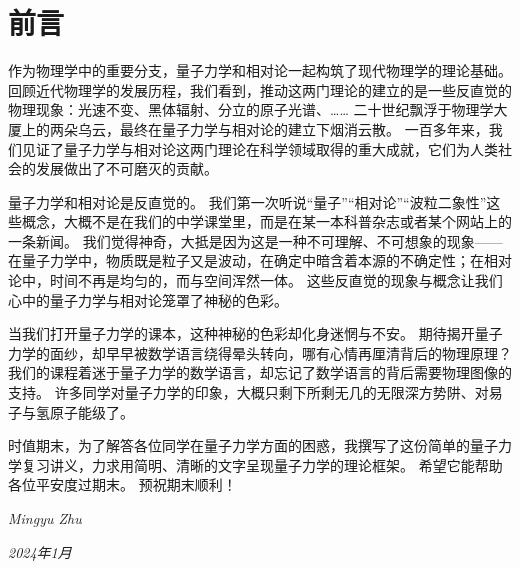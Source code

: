 
\section*{前言}

作为物理学中的重要分支，量子力学和相对论一起构筑了现代物理学的理论基础。
回顾近代物理学的发展历程，我们看到，推动这两门理论的建立的是一些反直觉的物理现象：光速不变、黑体辐射、分立的原子光谱、……
二十世纪飘浮于物理学大厦上的两朵乌云，最终在量子力学与相对论的建立下烟消云散。
一百多年来，我们见证了量子力学与相对论这两门理论在科学领域取得的重大成就，它们为人类社会的发展做出了不可磨灭的贡献。

量子力学和相对论是反直觉的。
我们第一次听说“量子”“相对论”“波粒二象性”这些概念，大概不是在我们的中学课堂里，而是在某一本科普杂志或者某个网站上的一条新闻。
我们觉得神奇，大抵是因为这是一种不可理解、不可想象的现象——在量子力学中，物质既是粒子又是波动，在确定中暗含着本源的不确定性；在相对论中，时间不再是均匀的，而与空间浑然一体。
这些反直觉的现象与概念让我们心中的量子力学与相对论笼罩了神秘的色彩。

当我们打开量子力学的课本，这种神秘的色彩却化身迷惘与不安。
期待揭开量子力学的面纱，却早早被数学语言绕得晕头转向，哪有心情再厘清背后的物理原理？
我们的课程着迷于量子力学的数学语言，却忘记了数学语言的背后需要物理图像的支持。
许多同学对量子力学的印象，大概只剩下所剩无几的无限深方势阱、对易子与氢原子能级了。

时值期末，为了解答各位同学在量子力学方面的困惑，我撰写了这份简单的量子力学复习讲义，力求用简明、清晰的文字呈现量子力学的理论框架。
希望它能帮助各位平安度过期末。
预祝期末顺利！

\hfill \textit{Mingyu Zhu}

\hfill \textit{2024年1月}
